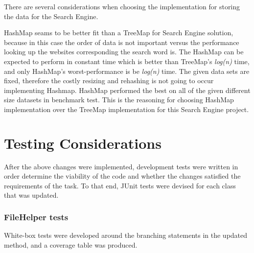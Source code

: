 There are several considerations when choosing the implementation for storing the data for the Search Engine.

HashMap seams to be better fit than a TreeMap for Search Engine solution, because in this case the order of data is not important versus the performance looking up the websites corresponding the search word is. The HashMap can be expected to perform in constant time which is better than TreeMap's \textit{log(n)} time, and only HashMap's worst-performance is be \textit{log(n)} time. The given data sets are fixed, therefore the costly resizing and rehashing is not going to occur implementing Hashmap. HashMap performed the best on all of the given different size datasets in benchmark test. This is the reasoning for choosing HashMap implementation over the TreeMap implementation for this Search Engine project.




\section{Testing Considerations}
After the above changes were implemented, development tests were written in order determine the viability of the code and whether the changes satisfied the requirements of the task. To that end, JUnit tests were devised for each class that was updated.

\subsubsection{FileHelper tests}

White-box tests were developed around the branching statements in the updated method, and a coverage table was produced.

